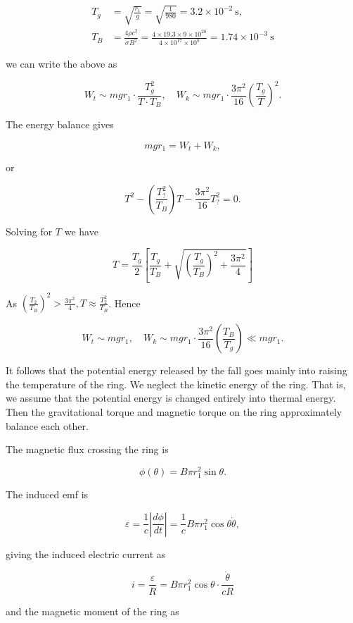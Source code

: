 \documentclass[10pt]{article}
\begin{document}
$$
\begin{aligned}
T_{g} &=\sqrt{\frac{r_{1}}{g}}=\sqrt{\frac{1}{980}}=3.2 \times 10^{-2} \mathrm{~s}, \\
T_{B} &=\frac{4 \rho c^{2}}{\sigma B^{2}}=\frac{4 \times 19.3 \times 9 \times 10^{20}}{4 \times 10^{17} \times 10^{8}}=1.74 \times 10^{-3} \mathrm{~s}
\end{aligned}
$$

we can write the above as

$$
W_{t} \sim m g r_{1} \cdot \frac{T_{g}^{2}}{T \cdot T_{B}}, \quad W_{k} \sim m g r_{1} \cdot \frac{3 \pi^{2}}{16}\left(\frac{T_{g}}{T}\right)^{2} .
$$

The energy balance gives

$$
m g r_{1}=W_{t}+W_{k},
$$

or

$$
T^{2}-\left(\frac{T_{?}^{2}}{T_{B}}\right) T-\frac{3 \pi^{2}}{16} T_{?}^{2}=0 .
$$

Solving for $T$ we have

$$
T=\frac{T_{g}}{2}\left[\frac{T_{g}}{T_{B}}+\sqrt{\left(\frac{T_{g}}{T_{B}}\right)^{2}+\frac{3 \pi^{2}}{4}}\right]
$$

As $\left(\frac{T_{2}}{T_{B}}\right)^{2}>\frac{3 \pi^{2}}{4}, T \approx \frac{T_{2}^{2}}{T_{B}}$. Hence

$$
W_{t} \sim m g r_{1}, \quad W_{k} \sim m g r_{1} \cdot \frac{3 \pi^{2}}{16}\left(\frac{T_{B}}{T_{g}}\right) \ll m g r_{1} .
$$

It follows that the potential energy released by the fall goes mainly into raising the temperature of the ring.
 We neglect the kinetic energy of the ring. That is, we assume that the potential energy is changed entirely into thermal energy. Then the gravitational torque and magnetic torque on the ring approximately balance each other.

The magnetic flux crossing the ring is

$$
\phi(\theta)=B \pi r_{1}^{2} \sin \theta .
$$

The induced emf is

$$
\varepsilon=\frac{1}{c}\left|\frac{d \phi}{d t}\right|=\frac{1}{c} B \pi r_{1}^{2} \cos \theta \dot{\theta},
$$

giving the induced electric current as

$$
i=\frac{\varepsilon}{R}=B \pi r_{1}^{2} \cos \theta \cdot \frac{\dot{\theta}}{c R}
$$

and the magnetic moment of the ring as
\end{document}
